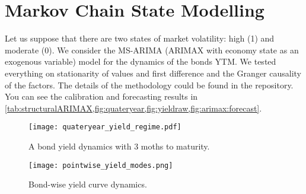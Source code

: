 \section{Markov Chain State Modelling}\label{sec:MCSM}
    Let us suppose that there are two states of market volatility: high (1) and moderate (0).
    We consider the MS-ARIMA (ARIMAX with economy state as an exogenous variable) model for the dynamics of the bonds YTM.
    We tested everything on stationarity of values and first difference and the Granger causality of the factors. The details of the methodology could be found in the repository.
    You can see the calibration and forecasting results in \cref{tab:structuralARIMAX,fig:quateryear,fig:yieldraw,fig:arimax:forecast}.


    \begin{figure}[htbp]
        \texttt{[image: quateryear\_yield\_regime.pdf]}
        \caption{A bond yield dynamics with 3 moths to maturity.}
        \label{fig:quateryear}
    \end{figure}

    \begin{figure}[htbp]
        \texttt{[image: pointwise\_yield\_modes.png]}
        \caption{Bond-wise yield curve dynamics.}
        \label{fig:yieldraw}
    \end{figure}

